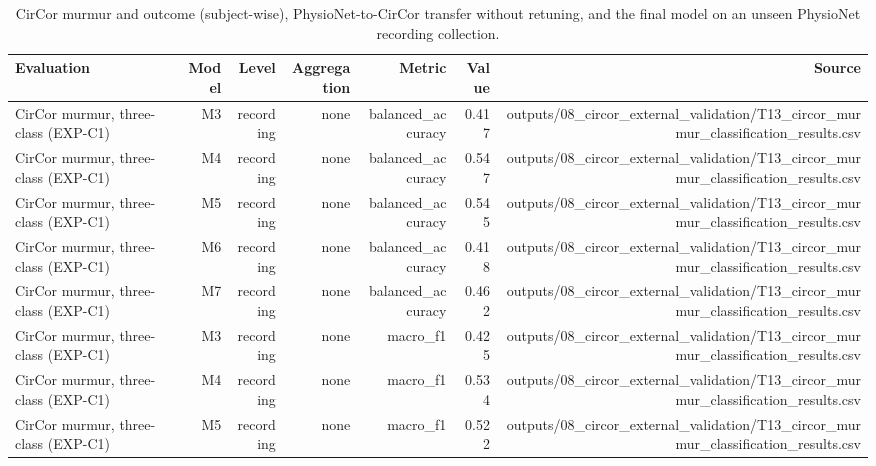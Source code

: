 \begin{table}[htbp]
  \centering
  \caption{CirCor murmur and outcome (subject-wise), PhysioNet-to-CirCor transfer without retuning, and the final model on an unseen PhysioNet recording collection.}
  \label{tab:q1_t08}
  \begin{tabular}{lrrrrrr}
    \toprule
    Evaluation & Model & Level & Aggregation & Metric & Value & Source \\
    \midrule
    CirCor murmur, three-class (EXP-C1) & M3 & recording & none & balanced\_accuracy & 0.417 & outputs/08\_circor\_external\_validation/T13\_circor\_murmur\_classification\_results.csv \\
    CirCor murmur, three-class (EXP-C1) & M4 & recording & none & balanced\_accuracy & 0.547 & outputs/08\_circor\_external\_validation/T13\_circor\_murmur\_classification\_results.csv \\
    CirCor murmur, three-class (EXP-C1) & M5 & recording & none & balanced\_accuracy & 0.545 & outputs/08\_circor\_external\_validation/T13\_circor\_murmur\_classification\_results.csv \\
    CirCor murmur, three-class (EXP-C1) & M6 & recording & none & balanced\_accuracy & 0.418 & outputs/08\_circor\_external\_validation/T13\_circor\_murmur\_classification\_results.csv \\
    CirCor murmur, three-class (EXP-C1) & M7 & recording & none & balanced\_accuracy & 0.462 & outputs/08\_circor\_external\_validation/T13\_circor\_murmur\_classification\_results.csv \\
    CirCor murmur, three-class (EXP-C1) & M3 & recording & none & macro\_f1 & 0.425 & outputs/08\_circor\_external\_validation/T13\_circor\_murmur\_classification\_results.csv \\
    CirCor murmur, three-class (EXP-C1) & M4 & recording & none & macro\_f1 & 0.534 & outputs/08\_circor\_external\_validation/T13\_circor\_murmur\_classification\_results.csv \\
    CirCor murmur, three-class (EXP-C1) & M5 & recording & none & macro\_f1 & 0.522 & outputs/08\_circor\_external\_validation/T13\_circor\_murmur\_classification\_results.csv \\

\end{tabular}
\end{table}
